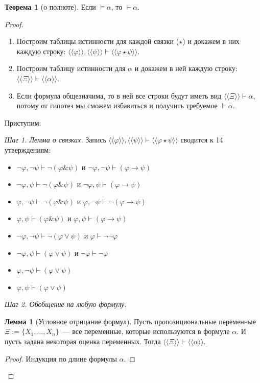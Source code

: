 \documentclass[a4paper,11pt]{article}
\theoremstyle{definition}
\newtheorem*{thm}{Теорема}
\newtheorem*{lmm}{Лемма}
\newcommand{\proves}{\vdash}
\newcommand{\amp}{\mathbin{\&}}
\newcommand{\cn}[1]{\langle\!\!\langle #1 \rangle\!\!\rangle}
\begin{document}
\begin{thm}[о полноте]
Если $\models \alpha$, то $\proves \alpha$.
\end{thm}
\begin{proof}
\begin{enumerate}
\item Построим таблицы истинности для каждой связки ($\star$) и докажем в них
  каждую строку: $\cn{\varphi}, \cn{\psi} \proves \cn{\varphi \star \psi}$.
\item Построим таблицу истинности для $\alpha$ и докажем в ней каждую строку:
  $\cn{\Xi} \proves \cn{\alpha}$.
\item Если формула общезначима, то в ней все строки будут иметь вид $\cn{\Xi}
  \proves \alpha$, потому от гипотез мы сможем избавиться и получить требуемое
  $\proves \alpha$.
\end{enumerate}
Приступим:

\emph{Шаг 1. Лемма о связках.} Запись $\cn{\varphi}, \cn{\psi} \proves
\cn{\varphi \star \psi}$ сводится к 14 утверждениям:
\begin{itemize}
\item $\neg\varphi, \neg\psi \proves \neg(\varphi \amp \psi)$ и $\neg\varphi,
  \neg\psi \proves (\varphi \to \psi)$
\item $\neg\varphi, \psi \proves \neg(\varphi \amp \psi)$ и $\neg\varphi, \psi
  \proves (\varphi \to \psi)$
\item $\varphi, \neg\psi \proves \neg(\varphi \amp \psi)$ и $\varphi, \neg\psi
  \proves \neg(\varphi \to \psi)$
\item $\varphi, \psi \proves (\varphi \amp \psi)$ и $\varphi, \psi \proves
  (\varphi \to \psi)$
\item $\neg\varphi, \neg\psi \proves \neg(\varphi \vee \psi)$ и $\varphi \proves
  \neg\neg\varphi$
\item $\neg\varphi, \psi \proves (\varphi \vee \psi)$ и $\neg\varphi \proves
  \neg\varphi$
\item $\varphi, \neg\psi \proves (\varphi \vee \psi)$
\item $\varphi, \psi \proves (\varphi \vee \psi)$
\end{itemize}

\emph{Шаг 2. Обобщение на любую формулу.}

\begin{lmm}[Условное отрицание формул]
Пусть пропозициональные переменные $\Xi := \{X_1, \dots, X_n\}$~--- все
переменные, которые используются в формуле $\alpha$. И пусть задана некоторая
оценка переменных. Тогда $\cn{\Xi} \proves \cn{\alpha}$.
\end{lmm}
\begin{proof}
Индукция по длине формулы $\alpha$.


\end{proof}
\end{proof}
\end{document}
